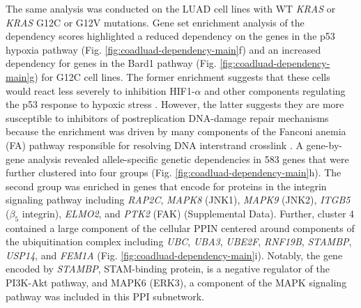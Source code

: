 \documentclass[english, 10pt, letterpaper]{article}
\newcommand{\KRAS}{\emph{KRAS}}
\begin{document}
The same analysis was conducted on the LUAD cell lines with WT \KRAS{} or \KRAS{} G12C or G12V mutations.
Gene set enrichment analysis of the dependency scores highlighted a reduced dependency on the genes in the p53 hypoxia pathway (Fig. \ref{fig:coadluad-dependency-main}f) and an increased dependency for genes in the Bard1 pathway (Fig. \ref{fig:coadluad-dependency-main}g) for G12C cell lines.
The former enrichment suggests that these cells would react less severely to inhibition HIF1-$\alpha$ and other components regulating the p53 response to hypoxic stress \cite{Goda2003Hypoxia-inducibleHypoxia., Sermeus2011ReciprocalPathways., Jing2019RoleMicroenvironment.}.
However, the latter suggests they are more susceptible to inhibitors of postreplication DNA-damage repair mechanisms because the enrichment was driven by many components of the Fanconi anemia (FA) pathway responsible for resolving DNA interstrand crosslink \cite{Ceccaldi2016TheFunctions.}.
A gene-by-gene analysis revealed allele-specific genetic dependencies in 583 genes that were further clustered into four groups (Fig. \ref{fig:coadluad-dependency-main}h).
The second group was enriched in genes that encode for proteins in the integrin signaling pathway including \emph{RAP2C}, \emph{MAPK8} (JNK1), \emph{MAPK9} (JNK2), \emph{ITGB5} ($\beta_5$ integrin), \emph{ELMO2}, and \emph{PTK2} (FAK) (Supplemental Data).
Further, cluster 4 contained a large component of the cellular PPIN centered around components of the ubiquitination complex including \emph{UBC}, \emph{UBA3}, \emph{UBE2F}, \emph{RNF19B}, \emph{STAMBP}, \emph{USP14}, and \emph{FEM1A} (Fig. \ref{fig:coadluad-dependency-main}i).
Notably, the gene encoded by \emph{STAMBP}, STAM-binding protein, is a negative regulator of the PI3K-Akt pathway, and MAPK6 (ERK3), a component of the MAPK signaling pathway was included in this PPI subnetwork. 
\end{document}
